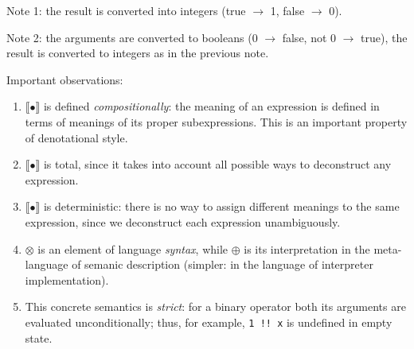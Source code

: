 \documentclass{article}
\newcommand{\sembr}[1]{\llbracket{#1}\rrbracket}
\theoremstyle{definition}
\begin{document}
Note 1: the result is converted into integers (true $\to$ 1, false $\to$ 0).

Note 2: the arguments are converted to booleans (0 $\to$ false, not 0 $\to$ true), the result is converted to integers as in the previous note.

Important observations:

\begin{enumerate}
  \item $\sembr{\bullet}$ is defined \emph{compositionally}: the meaning of an expression is defined in terms of meanings
  of its proper subexpressions. This is an important property of denotational style.
  \item $\sembr{\bullet}$ is total, since it takes into account all possible ways to deconstruct any expression.
  \item $\sembr{\bullet}$ is deterministic: there is no way to assign different meanings to the same expression, since
  we deconstruct each expression unambiguously.
  \item $\otimes$ is an element of language \emph{syntax}, while $\oplus$ is its interpretation in the meta-language of
  semanic description (simpler: in the language of interpreter implementation).
  \item This concrete semantics is \emph{strict}: for a binary operator both its arguments are evaluated unconditionally; thus,
  for example, \lstinline|1 !! x| is undefined in empty state.
\end{enumerate}
\end{document}
